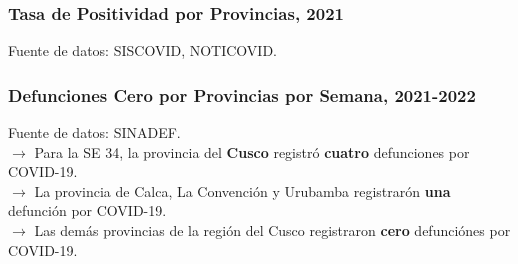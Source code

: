 \documentclass[xcolor=table]{beamer}
\begin{document}
	\begin{frame}
		\frametitle{Tasa de Positividad por Provincias, 2021}
		\vspace{-.5cm}
		
		\begin{table}[]
			\resizebox{\textwidth}{!}{%
				
			}
		\end{table}	
		{\tiny Fuente de datos: SISCOVID, NOTICOVID.}
		
	\end{frame}
	
	\begin{frame}
		\frametitle{Defunciones Cero por Provincias por Semana, 2021-2022}
		\vspace{-.5cm}
		
		\begin{table}[]
			\resizebox{\textwidth}{!}{%
				
			}
		\end{table}	
		{\tiny Fuente de datos: SINADEF. \\}
		\vspace{0.2cm}
		$\rightarrow$ Para la SE 34, la provincia del \textbf{\color{mycolor5}Cusco} registró \textbf{\color{mycolor5}cuatro} defunciones por COVID-19.\\
		$\rightarrow$ La provincia de Calca, La Convención y Urubamba registrarón \textbf{\color{mycolor5}una} defunción por COVID-19.\\
		$\rightarrow$ Las demás provincias de la región del Cusco registraron \textbf{\color{mycolor5}cero} defunciónes por COVID-19.
	\end{frame}
	
\end{document}
